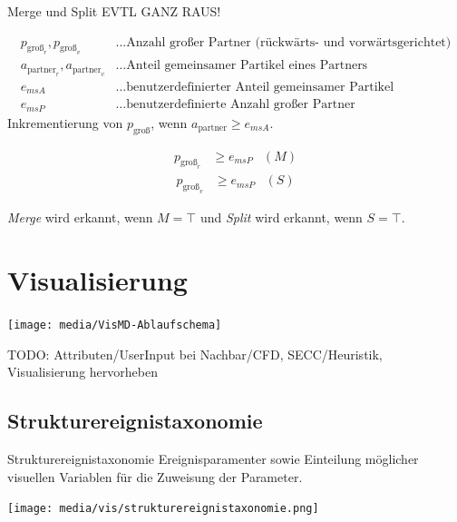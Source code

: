\documentclass[10pt]{beamer}
\newcommand{\wichtig}[1]{\textit{#1}}
\begin{document}
\begin{frame}{Merge und Split}
	EVTL GANZ RAUS!
	
	\begin{align*}
		p_{\text{groß}_r}, p_{\text{groß}_v} &\ldots \text{Anzahl großer Partner (rückwärts- und vorwärtsgerichtet)}\\
		a_{\text{partner}_r}, a_{\text{partner}_v} &\ldots \text{Anteil gemeinsamer Partikel eines Partners}\\
		e_{msA} &\ldots \text{benutzerdefinierter Anteil gemeinsamer Partikel}\\
		e_{msP} &\ldots \text{benutzerdefinierte Anzahl großer Partner}
	\end{align*}
	Inkrementierung von $p_{\text{groß}}$, wenn $a_{\text{partner}} \ge e_{msA}$.
	
	\begin{equation}
	\begin{aligned}\label{eq:merge}
	p_{\text{groß}_r} &\ge e_{msP} &(M)
	\end{aligned}
	\end{equation}
	\begin{equation}
	\begin{aligned}\label{eq:split}
	p_{\text{groß}_v} &\ge e_{msP} &(S)
	\end{aligned}
	\end{equation}
	
	\wichtig{Merge} wird erkannt, wenn $M = \top$ und \wichtig{Split} wird erkannt, wenn $S = \top$.
\end{frame}


\section{Visualisierung}
\begin{frame}
	\texttt{[image: media/VisMD-Ablaufschema]}
	
	TODO: Attributen/UserInput bei Nachbar/CFD, SECC/Heuristik, Visualisierung hervorheben
\end{frame}

\subsection{Strukturereignistaxonomie}

%
%
\begin{frame}{Strukturereignistaxonomie}
	Ereignisparamenter sowie Einteilung möglicher visuellen Variablen für die Zuweisung der Parameter.

	\texttt{[image: media/vis/strukturereignistaxonomie.png]}
\end{frame}
\end{document}
